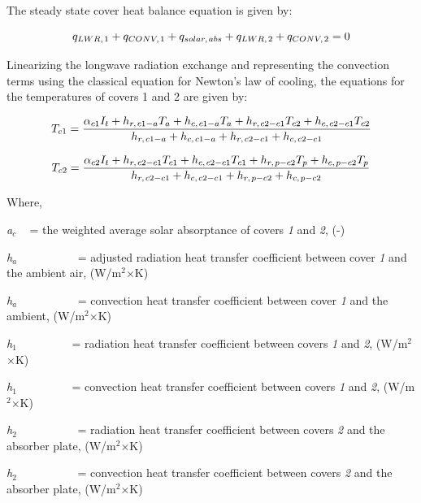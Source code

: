 The steady state cover heat balance equation is given by:

\begin{equation}
{q_{LWR,{\kern 1pt} 1}} + {q_{CONV,{\kern 1pt} 1}} + {q_{solar,{\kern 1pt} abs}} + {q_{LWR,{\kern 1pt} 2}} + {q_{CONV,{\kern 1pt} 2}} = 0
\end{equation}

Linearizing the longwave radiation exchange and representing the convection terms using the classical equation for Newton's law of cooling, the equations for the temperatures of covers 1 and 2 are given by:

\begin{equation}
{T_{c{\rm{1}}}} = \frac{{{\alpha_{c1}}{I_t} + {h_{r,{\kern 1pt} c1 - a}}{T_a} + {h_{c,{\kern 1pt} c1 - a}}{T_a} + {h_{r,{\kern 1pt} c2 - c1}}{T_{c2}} + {h_{c,{\kern 1pt} c2 - c1}}{T_{c2}}}}{{{h_{r,{\kern 1pt} c1 - a}} + {h_{c,{\kern 1pt} c1 - a}} + {h_{r,{\kern 1pt} c2 - c1}} + {h_{c,{\kern 1pt} c2 - c1}}}}
\end{equation}

\begin{equation}
{T_{c2}} = \frac{{{\alpha_{c2}}{I_t} + {h_{r,{\kern 1pt} c2 - c1}}{T_{c1}} + {h_{c,{\kern 1pt} c2 - c1}}{T_{c1}} + {h_{r,{\kern 1pt} p - c2}}{T_p} + {h_{c,{\kern 1pt} p - c2}}{T_p}}}{{{h_{r,{\kern 1pt} c2 - c1}} + {h_{c,{\kern 1pt} c2 - c1}} + {h_{r,{\kern 1pt} p - c2}} + {h_{c,{\kern 1pt} p - c2}}}}
\end{equation}

Where,

\emph{a\(_{c}\)} ~ = the weighted average solar absorptance of covers \emph{1} and \emph{2}, (-)

\emph{h\(_{a}\)}~~~~~~~~~~ = adjusted radiation heat transfer coefficient between cover \emph{1} and the ambient air, (W/m\(^{2}\)×K)

\emph{h\(_{a}\)}~~~~~~~~~~ = convection heat transfer coefficient between cover \emph{1} and the ambient, (W/m\(^{2}\)×K)

\emph{h\(_{1}\)}~~~~~~~~~ = radiation heat transfer coefficient between covers \emph{1} and \emph{2}, (W/m\(^{2}\)×K)

\emph{h\(_{1}\)}~~~~~~~~~ = convection heat transfer coefficient between covers \emph{1} and \emph{2}, (W/m\(^{2}\)×K)

\emph{h\(_{2}\)}~~~~~~~~~~ = radiation heat transfer coefficient between covers \emph{2} and the absorber plate, (W/m\(^{2}\)×K)

\emph{h\(_{2}\)}~~~~~~~~~~ = convection heat transfer coefficient between covers \emph{2} and the absorber plate, (W/m\(^{2}\)×K)


